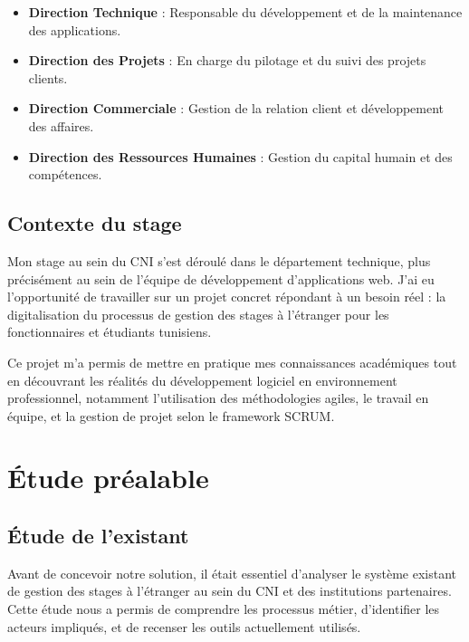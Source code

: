 \documentclass[12pt,a4paper]{report}
\begin{document}
\begin{itemize}[leftmargin=1cm]
    \item \textbf{Direction Technique} : Responsable du développement et de la maintenance des applications.
    
    \item \textbf{Direction des Projets} : En charge du pilotage et du suivi des projets clients.
    
    \item \textbf{Direction Commerciale} : Gestion de la relation client et développement des affaires.
    
    \item \textbf{Direction des Ressources Humaines} : Gestion du capital humain et des compétences.
\end{itemize}

\subsection{Contexte du stage}

Mon stage au sein du CNI s'est déroulé dans le département technique, plus précisément au sein de l'équipe de développement d'applications web. J'ai eu l'opportunité de travailler sur un projet concret répondant à un besoin réel : la digitalisation du processus de gestion des stages à l'étranger pour les fonctionnaires et étudiants tunisiens.

Ce projet m'a permis de mettre en pratique mes connaissances académiques tout en découvrant les réalités du développement logiciel en environnement professionnel, notamment l'utilisation des méthodologies agiles, le travail en équipe, et la gestion de projet selon le framework SCRUM.

\section{Étude préalable}

\subsection{Étude de l'existant}

Avant de concevoir notre solution, il était essentiel d'analyser le système existant de gestion des stages à l'étranger au sein du CNI et des institutions partenaires. Cette étude nous a permis de comprendre les processus métier, d'identifier les acteurs impliqués, et de recenser les outils actuellement utilisés.
\end{document}
